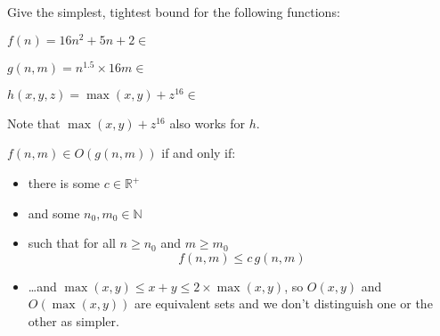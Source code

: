 
Give the simplest, tightest bound for the following functions:

$f(n) = 16n^2 + 5n + 2 \in$ 

$g(n,m) = n^{1.5} \times 16m \in$ 

$h(x,y,z) = \max(x,y) + z^{16} \in$ 

\begin{solution}
Note that $\max(x,y) + z^{16}$ also works for $h$.

\bigskip
$f(n,m) \in O(g(n,m))$ if and only if:
\begin{itemize}
\item%
  there is some $c \in \mathbb{R}^+$
\item%
  and some $n_0, m_0 \in \mathbb{N}$
\item%
  such that for all $n \geq n_0$ and $m \geq m_0$
  $$
  f(n,m) \leq c \, g(n,m)
  $$
\item%
  \ldots and $\max(x,y) \leq x+y \leq 2 \times \max(x,y)$, so $O(x,y)$
  and $O(\max(x,y))$ are equivalent sets and we don't distinguish one
  or the other as simpler.
\end{itemize}
\end{solution}
